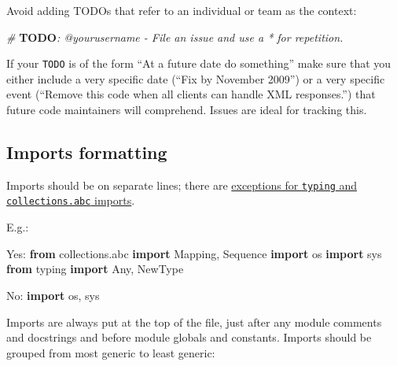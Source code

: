 \documentclass[
]{article}
\newenvironment{Shaded}{}{}
\newcommand{\AlertTok}[1]{\textcolor[rgb]{1.00,0.00,0.00}{\textbf{#1}}}
\newcommand{\CommentTok}[1]{\textcolor[rgb]{0.38,0.63,0.69}{\textit{#1}}}
\newcommand{\ImportTok}[1]{\textcolor[rgb]{0.00,0.50,0.00}{\textbf{#1}}}
\newcommand{\NormalTok}[1]{#1}
\begin{document}
Avoid adding TODOs that refer to an individual or team as the context:

\begin{samepage}
\begin{Shaded}
\begin{Highlighting}[]
\CommentTok{\# }\AlertTok{TODO}\CommentTok{: @yourusername {-} File an issue and use a \textquotesingle{}*\textquotesingle{} for repetition.}
\end{Highlighting}
\end{Shaded}
\end{samepage}

If your \texttt{TODO} is of the form ``At a future date do something''
make sure that you either include a very specific date (``Fix by
November 2009'') or a very specific event (``Remove this code when all
clients can handle XML responses.'') that future code maintainers will
comprehend. Issues are ideal for tracking this.

\subsection{Imports formatting}

Imports should be on separate lines; there are
\hyperref[typing-imports]{exceptions for \texttt{typing} and
\texttt{collections.abc} imports}.

E.g.:

\begin{samepage}
\begin{Shaded}
\begin{Highlighting}[]
\NormalTok{Yes: }\ImportTok{from}\NormalTok{ collections.abc }\ImportTok{import}\NormalTok{ Mapping, Sequence}
     \ImportTok{import}\NormalTok{ os}
     \ImportTok{import}\NormalTok{ sys}
     \ImportTok{from}\NormalTok{ typing }\ImportTok{import}\NormalTok{ Any, NewType}
\end{Highlighting}
\end{Shaded}
\end{samepage}

\begin{samepage}
\begin{Shaded}
\begin{Highlighting}[]
\NormalTok{No:  }\ImportTok{import}\NormalTok{ os, sys}
\end{Highlighting}
\end{Shaded}
\end{samepage}

Imports are always put at the top of the file, just after any module
comments and docstrings and before module globals and constants. Imports
should be grouped from most generic to least generic:
\end{document}
